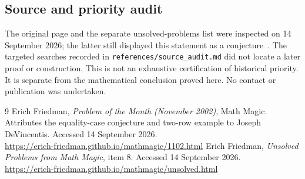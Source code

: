 \documentclass[11pt]{article}
\begin{document}
\subsection*{Source and priority audit}
The original page and the separate unsolved-problems list were inspected on
14 September 2026; the latter still displayed this statement as a
conjecture~\cite{unsolved}. The targeted searches recorded in
\texttt{references/source\_audit.md} did not locate a later proof or construction.
This is not an exhaustive certification of historical priority. It is
separate from the mathematical conclusion proved here. No contact or
publication was undertaken.

\begin{thebibliography}{9}
 Erich Friedman, \emph{Problem of the Month (November 2002)},
Math Magic. Attributes the equality-case conjecture and two-row example to
Joseph DeVincentis. Accessed 14 September 2026.\\
\url{https://erich-friedman.github.io/mathmagic/1102.html}
 Erich Friedman, \emph{Unsolved Problems from Math Magic},
item 8. Accessed 14 September 2026.\\
\url{https://erich-friedman.github.io/mathmagic/unsolved.html}
\end{thebibliography}
\endgroup
\end{document}
